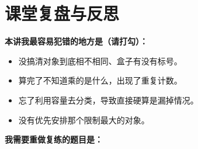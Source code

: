 \documentclass[11pt,a4paper]{ctexart}
\begin{document}
\newpage

{\small \qProbPermMinMaxCapStem}

{\small \qProbPermSymmPosStem}

\newpage

{\small \qProbPermMultiDayStem}

{\small \qProbPermSpecGroupStem}

\newpage

\section{课堂复盘与反思}

\vspace{0.5em}
\noindent\textbf{本讲我最容易犯错的地方是（请打勾）：}
\begin{itemize}[itemsep=0.4em]
  \item \checkbox 没搞清对象到底相不相同、盒子有没有标号。
  \item \checkbox 算完了不知道乘的是什么，出现了重复计数。
  \item \checkbox 忘了利用容量去分类，导致直接硬算是漏掉情况。
  \item \checkbox 没有优先安排那个限制最大的对象。
\end{itemize}

\vspace{1em}
\noindent\textbf{我需要重做复练的题目是：}
\vspace{0.5em}

\blank{14cm}
\end{document}
